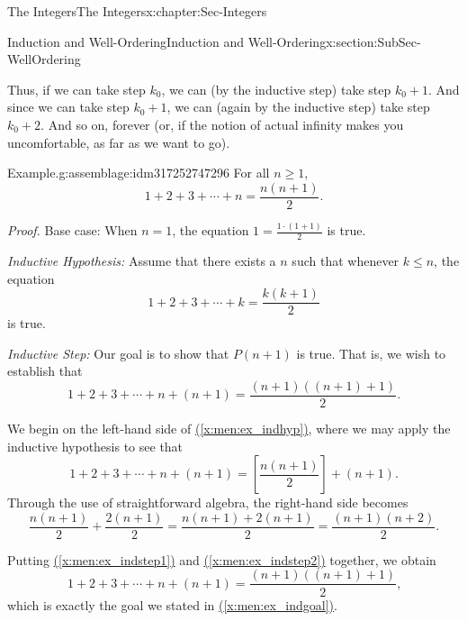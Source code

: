 \documentclass[oneside,10pt,]{book}
\newcommand{\xreffont}{\relax}
\numberwithin{equation}{section}
\renewcommand{\le}{\leqslant}
\renewcommand{\ge}{\geqslant}
\begin{document}
\begin{chapterptx}{The Integers}{}{The Integers}{}{}{x:chapter:Sec-Integers}
\begin{sectionptx}{Induction and Well-Ordering}{}{Induction and Well-Ordering}{}{}{x:section:SubSec-WellOrdering}
\par
Thus, if we can take step \(k_0\), we can (by the inductive step) take step \(k_0 + 1\). And since we can take step \(k_0 + 1\), we can (again by the inductive step) take step \(k_0 + 2\). And so on, forever (or, if the notion of actual infinity makes you uncomfortable, as far as we want to go).%
\begin{assemblage}{Example.}{g:assemblage:idm317252747296}%
For all \(n \ge 1\),%
\begin{equation*}
1+ 2 + 3 + \cdots + n = \frac{n(n+1)}{2}\text{.}
\end{equation*}
%
\par
\emph{Proof.} Base case: When \(n = 1\), the equation \(1 = \frac{1\cdot (1+1)}{2}\) is true.%
\par
\emph{Inductive Hypothesis:} Assume that there exists a \(n\) such that whenever \(k \le n\), the equation%
\begin{equation}
1+ 2 + 3 + \cdots + k = \frac{k(k+1)}{2}\label{x:men:ex_indhyp}
\end{equation}
is true.%
\par
\emph{Inductive Step:} Our goal is to show that \(P(n+1)\) is true. That is, we wish to establish that%
\begin{equation}
1+ 2 + 3 + \cdots + n + (n+1) = \frac{(n+1)((n+1)+1)}{2}\text{.}\label{x:men:ex_indgoal}
\end{equation}
%
\par
We begin on the left-hand side of \hyperref[x:men:ex_indhyp]{({\xreffont\ref{x:men:ex_indhyp}})}, where we may apply the inductive hypothesis to see that%
\begin{equation}
1+ 2 + 3 + \cdots + n + (n+1) = \left[\frac{n(n+1)}{2}\right] + (n+1)\text{.}\label{x:men:ex_indstep1}
\end{equation}
Through the use of straightforward algebra, the right-hand side becomes%
\begin{equation}
\frac{n(n+1)}{2} + \frac{2(n+1)}{2} = \frac{n(n+1) + 2(n+1)}{2} = \frac{(n+1)(n+2)}{2}\text{.}\label{x:men:ex_indstep2}
\end{equation}
%
\par
Putting \hyperref[x:men:ex_indstep1]{({\xreffont\ref{x:men:ex_indstep1}})} and \hyperref[x:men:ex_indstep2]{({\xreffont\ref{x:men:ex_indstep2}})} together, we obtain%
\begin{equation*}
1+ 2 + 3 + \cdots + n + (n+1) = \frac{(n+1)((n+1)+1)}{2}\text{,}
\end{equation*}
which is exactly the goal we stated in \hyperref[x:men:ex_indgoal]{({\xreffont\ref{x:men:ex_indgoal}})}.%

\end{assemblage}
\end{sectionptx}
\end{chapterptx}
\end{document}
